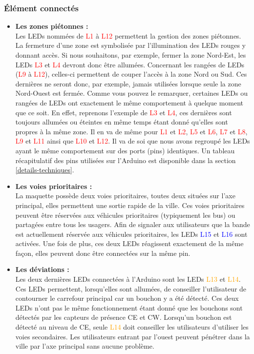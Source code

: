 \subsubsection{Élément connectés}
\begin{itemize}
\item \textbf{Les zones piétonnes :}\\
Les LEDs nommées de \textcolor{red}{L1} à \textcolor{red}{L12} permettent la gestion des zones piétonnes. La fermeture d’une zone est symbolisée par l’illumination des LEDs rouges y donnant accès. Si nous souhaitons, par exemple, fermer la zone Nord-Est, les LEDs \textcolor{red}{L3} et \textcolor{red}{L4} devront donc être allumées. Concernant les rangées de LEDs (\textcolor{red}{L9} à \textcolor{red}{L12}), celles-ci permettent de couper l’accès à la zone Nord ou Sud. Ces dernières ne seront donc, par exemple, jamais utilisées lorsque seule la zone Nord-Ouest est fermée.
Comme vous pouvez le remarquer, certaines LEDs ou rangées de LEDs ont exactement le même comportement à quelque moment que ce soit. En effet, reprenons l’exemple de \textcolor{red}{L3} et \textcolor{red}{L4}, ces dernières sont toujours allumées ou éteintes en même temps étant donné qu’elles sont propres à la même zone. Il en va de même pour \textcolor{red}{L1} et \textcolor{red}{L2}, \textcolor{red}{L5} et \textcolor{red}{L6}, \textcolor{red}{L7} et \textcolor{red}{L8}, \textcolor{red}{L9} et \textcolor{red}{L11} ainsi que \textcolor{red}{L10} et \textcolor{red}{L12}. Il va de soi que nous avons regroupé les LEDs ayant le même comportement sur des ports (pins) identiques. Un tableau récapitulatif des pins utilisées sur l’Arduino est disponible dans la section \ref{details-techniques}.

\item \textbf{Les voies prioritaires :}\\
La maquette possède deux voies prioritaires, toutes deux situées sur l’axe principal, elles permettent une sortie rapide de la ville. Ces voies prioritaires peuvent être réservées aux véhicules prioritaires (typiquement les bus) ou partagées entre tous les usagers. Afin de signaler aux utilisateurs que la bande est actuellement réservée aux véhicules prioritaires, les LEDs \textcolor{blue}{L15} et \textcolor{blue}{L16} sont activées. Une fois de plus, ces deux LEDs réagissent exactement de la même façon, elles peuvent donc être connectées sur la même pin.

\item \textbf{Les déviations :}\\
Les deux dernières LEDs connectées à l’Arduino sont les LEDs \textcolor{orange}{L13} et \textcolor{orange}{L14}. Ces LEDs permettent, lorsqu’elles sont allumées, de conseiller l’utilisateur de contourner le carrefour principal car un bouchon y a été détecté. Ces deux LEDs n’ont pas le même fonctionnement étant donné que les bouchons sont détectés par les capteurs de présence CE et CW. Lorsqu’un bouchon est détecté au niveau de CE, seule \textcolor{orange}{L14} doit conseiller les utilisateurs d’utiliser les voies secondaires. Les utilisateurs entrant par l’ouest peuvent pénétrer dans la ville par l’axe principal sans aucune problème.


\end{itemize}

